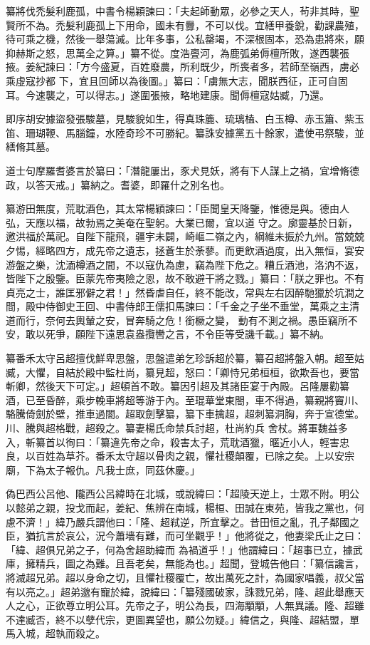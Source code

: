 \begin{pinyinscope}
 纂將伐禿髮利鹿孤，中書令楊穎諫曰：「夫起師動眾，必參之天人，茍非其時，聖賢所不為。禿髮利鹿孤上下用命，國未有釁，不可以伐。宜繕甲養銳，勸課農殖，待可乘之機，然後一舉蕩滅。比年多事，公私罄竭，不深根固本，恐為患將來，願抑赫斯之怒，思萬全之算。」纂不從。度浩亹河，為鹿弧弟傉檀所敗，遂西襲張掖。姜紀諫曰：「方今盛夏，百姓廢農，所利既少，所喪者多，若師至嶺西，虜必乘虛寇抄都
 下，宜且回師以為後圖。」纂曰：「虜無大志，聞朕西征，正可自固耳。今速襲之，可以得志。」遂圍張掖，略地建康。聞傉檀寇姑臧，乃還。



 即序胡安據盜發張駿墓，見駿貌如生，得真珠簏、琉璃榼、白玉樽、赤玉簫、紫玉笛、珊瑚鞭、馬腦鐘，水陸奇珍不可勝紀。纂誅安據黨五十餘家，遣使弔祭駿，並繕脩其墓。



 道士句摩羅耆婆言於纂曰：「潛龍屢出，豕犬見妖，將有下人謀上之禍，宜增脩德政，以答天戒。」纂納之。耆婆，即羅什之別名也。



 纂游田無度，荒耽酒色，其太常楊穎諫曰：「臣聞皇天降鑒，惟德是與。德由人弘，天應以福，故勃焉之美奄在聖躬。大業已爾，宜以道
 守之。廓靈基於日新，邀洪福於萬祀。自陛下龍飛，疆宇未闢，崎嶇二嶺之內，綱維未振於九州。當兢兢夕惕，經略四方，成先帝之遺志，拯蒼生於荼蓼。而更飲酒過度，出入無恒，宴安游盤之樂，沈湎樽酒之間，不以寇仇為慮，竊為陛下危之。糟丘酒池，洛汭不返，皆陛下之殷鑒。臣蒙先帝夷險之恩，故不敢避干將之戮。」纂曰：「朕之罪也。不有貞亮之士，誰匡邪僻之君！」然昏虐自任，終不能改，常與左右因醉馳獵於坑澗之間，殿中侍御史王回、中書侍郎王儒扣馬諫曰：「千金之子坐不垂堂，萬乘之主清道而行，奈何去輿輦之安，冒奔騎之危！銜橛之變，
 動有不測之禍。愚臣竊所不安，敢以死爭，願陛下遠思袁盎攬轡之言，不令臣等受譏千載。」纂不納。



 纂番禾太守呂超擅伐鮮卑思盤，思盤遣弟乞珍訴超於纂，纂召超將盤入朝。超至姑臧，大懼，自結於殿中監杜尚，纂見超，怒曰：「卿恃兄弟桓桓，欲欺吾也，要當斬卿，然後天下可定。」超頓首不敢。纂因引超及其諸臣宴于內殿。呂隆屢勸纂酒，已至昏醉，乘步輓車將超等游于內。至琨華堂東閤，車不得過，纂親將竇川、駱騰倚劍於壁，推車過閤。超取劍擊纂，纂下車擒超，超刺纂洞胸，奔于宣德堂。川、騰與超格戰，超殺之。纂妻楊氏命禁兵討超，杜尚約兵
 舍杖。將軍魏益多入，斬纂首以徇曰：「纂違先帝之命，殺害太子，荒耽酒獵，暱近小人，輕害忠良，以百姓為草芥。番禾太守超以骨肉之親，懼社稷顛覆，已除之矣。上以安宗廟，下為太子報仇。凡我士庶，同茲休慶。」



 偽巴西公呂他、隴西公呂緯時在北城，或說緯曰：「超陵天逆上，士眾不附。明公以懿弟之親，投戈而起，姜紀、焦辨在南城，楊桓、田誠在東苑，皆我之黨也，何慮不濟！」緯乃嚴兵謂他曰：「隆、超弒逆，所宜擊之。昔田恒之亂，孔子鄰國之臣，猶抗言於哀公，況今蕭墻有難，而可坐觀乎！」他將從之，他妻梁氏止之曰：「緯、超俱兄弟之子，何為舍超助緯而
 為禍道乎！」他謂緯曰：「超事已立，據武庫，擁精兵，圖之為難。且吾老矣，無能為也。」超聞，登城告他曰：「纂信讒言，將滅超兄弟。超以身命之切，且懼社稷覆亡，故出萬死之計，為國家唱義，叔父當有以亮之。」超弟邈有寵於緯，說緯曰：「纂殘國破家，誅戮兄弟，隆、超此舉應天人之心，正欲尊立明公耳。先帝之子，明公為長，四海顒顒，人無異議。隆、超雖不達臧否，終不以孽代宗，更圖異望也，願公勿疑。」緯信之，與隆、超結盟，單馬入城，超執而殺之。




\end{pinyinscope}
